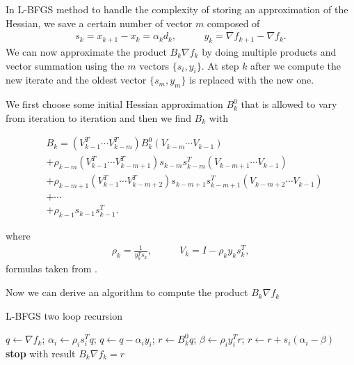 In L-BFGS method to handle the complexity of storing an approximation of the Hessian, we save a certain number of vector $m$ composed of 
\begin{align}
s_{k}=x_{k+1}-x_{k}=\alpha_{k}d_{k}, & \qquad
y_{k}=\nabla f_{k+1} - \nabla f_{k}.
\end{align}
We can now approximate the product $B_{k}\nabla f_{k}$ by doing multiple products and vector summation using the $m$ vectors $\{s_{i},y_{i}\}$. At step $k$ after we compute the new iterate and the oldest vector $\{s_{m},y_{m}\}$ is replaced with the new one.

We first choose some initial Hessian approximation $B^0_{k}$ that is allowed to vary from iteration to iteration and then we find $B_{k}$ with

\begin{equation} 
\begin{aligned}
&B_{k}=(V^T_{k-1}\cdots V^T_{k-m})B^0_{k}(V_{k-m}\cdots V_{k-1})\\           
&+\rho_{k-m}(V^T_{k-1}\cdots V^T_{k-m+1})s_{k-m}s^T_{k-m}(V_{k-m+1}\cdots V_{k-1})\\
&+\rho_{k-m+1}(V^T_{k-1}\cdots V^T_{k-m+2})s_{k-m+1}s^T_{k-m+1}(V_{k-m+2}\cdots V_{k-1})\\
&+ \cdots \\
&+\rho_{k-1}s_{k-1}s^T_{k-1}.  
\end{aligned}
\end{equation}

where
\begin{align}
\rho_{k}= \frac{1}{y^T_{k}s_{k}}, & \qquad
V_{k} = I - \rho_{k} y_{k}s^T_{k},
\end{align}
formulas taken from \cite{numerical}.

Now we can derive an algorithm to compute the product $B_{k}\nabla f_{k}$

\begin{algorithm}[H]
	\caption{L-BFGS two loop recursion}
	\label{L-BFGSTwoLoop}
	\begin{algorithmic}[3]
	
		\State $q \gets \nabla f_{k}$;
        \State $ \alpha_{i} \gets \rho_{i}s^T_{i}q$;
        \State $q \gets q - \alpha_{i}y_{i}$; 
      \EndFor
 	  \State $r \gets B^0_{k}q$;
 	  \State $\beta \gets \rho_{i}y^T_{i}r$; 
 	  \State $r \gets r + s_{i}(\alpha_{i}-\beta)$
 	  \EndFor
	  \State \textbf{stop} with result $B_{k}\nabla f_{k}=r$
	\end{algorithmic}
\end{algorithm}


